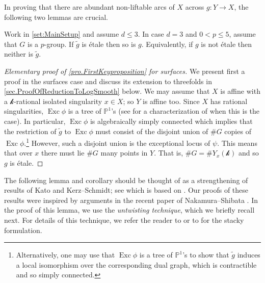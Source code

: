 \documentclass[12pt]{amsart}
\theoremstyle{plain}   %
\theoremstyle{definition}    %
\theoremstyle{remark}    %
\numberwithin{equation}{theorem}
\DeclareMathOperator{\Exc}{{Exc}}
\newcommand{\kay}{\mathcal{k}}
\newcommand{\bP}{\mathbb{P}}
\begin{document}
In proving that there are abundant non-liftable arcs of $X$ across $g\colon Y \to X$, the following two lemmas are crucial.

\begin{lemma} \label{pro.FirstKeyproposition}
Work in \autoref{set:MainSetup} and assume $d\leq 3$. In case $d = 3$ and $0< p \leq 5$, assume that $G$ is a $p$-group. If $\tilde{g}$ is \'etale then so is $g$. Equivalently, if $g$ is not \'etale then neither is $\tilde{g}$. 
\end{lemma}
\begin{proof}[Elementary proof of \autoref{pro.FirstKeyproposition} for surfaces]
We present first a proof in the surfaces case and discuss its extension to threefolds in \autoref{sec.ProofOfReductionToLogSmooth} below. We may assume that $X$ is affine with a $\kay$-rational isolated singularity $x\in X$; so $Y$ is affine too. Since $X$ has rational singularities, $\Exc{\phi}$ is a tree of $\bP^1$'s (see \cite[Theorem 4.1]{EsnaultViehwegSurfaceSingularitiesDominatedSmoothVarieties} for a characterization of when this is the case). In particular, $\Exc \phi$ is algebraically simply connected which implies that the restriction of $\tilde{g}$ to $\Exc \phi$ must consist of the disjoint union of $\# G$ copies of $\Exc \phi$.\footnote{Alternatively, one may use that $\Exc \phi$ is a tree of $\bP^1$'s to show that $\tilde{g}$ induces a local isomorphism over the corresponding dual graph, which is contractible and so simply connected.} However, such a disjoint union is the exceptional locus of $\psi$. This means that over $x$ there must lie $\# G$ many points in $Y$. That is, $\# G = \#Y_x(\kay)$ and so $g$ is \'etale.
\end{proof}
The following lemma and corollary should be thought of as a strengthening of results of Kato and Kerz--Schmidt; see \cite[Lemma 3.5]{KatoWildRamificationRestrictionCurves} which is based on \cite[Lemma 2.4]{KerzSchmidtOnDifferentNotionsOfTameness}. Our proofs  of these results were inspired by arguments in the recent paper of Nakamura--Shibata \cite{NakamuraShibataInversionOdAdjunctionForQuotientSingularities}. 
In the proof of this lemma, we use the \emph{untwisting technique}, which we briefly recall next. For details of this technique, we refer the reader to \cite[\S 4 and \S 7]{YasudaWilderMcKayCorrespondence} or to \cite[\S 6]{YasudaMotivicIntegrationDeligneMumfordStack} for the stacky formulation. 
\end{document}
